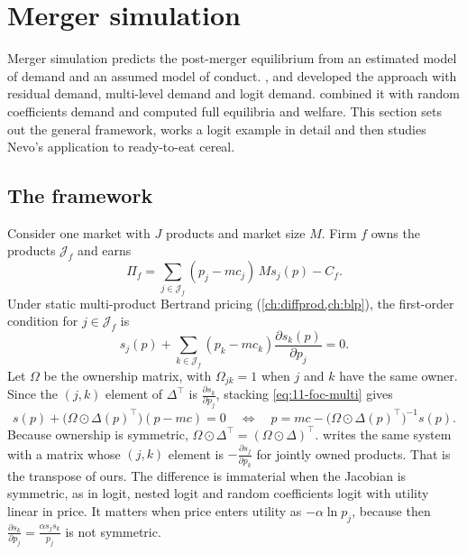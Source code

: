 \section{Merger simulation}\label{sec:11-simulation}

Merger simulation predicts the post-merger equilibrium from an estimated model of demand and an assumed model of
conduct. \citet{BakerBresnahan1985}, \citet{HausmanLeonardZona1994} and \citet{WerdenFroeb1994} developed the approach
with residual demand, multi-level demand and logit demand. \citet{Nevo2000b} combined it with random coefficients
demand and computed full equilibria and welfare. This section sets out the general framework, works a logit example
in detail and then studies Nevo's application to ready-to-eat cereal.

\subsection{The framework}\label{sec:11-simframework}

Consider one market with $J$ products and market size $M$. Firm $f$ owns the products $\mathcal{J}_f$ and earns
\begin{equation*}
  \Pi_f = \sum_{j \in \mathcal{J}_f} (p_j - mc_j)\, M s_j(p) - C_f .
\end{equation*}
Under static multi-product Bertrand pricing (\cref{ch:diffprod,ch:blp}), the first-order condition for $j \in
\mathcal{J}_f$ is
\begin{equation}\label{eq:11-foc-multi}
  s_j(p) + \sum_{k \in \mathcal{J}_f} (p_k - mc_k)\frac{\partial s_k(p)}{\partial p_j} = 0 .
\end{equation}
Let $\Omega$ be the ownership matrix, with $\Omega_{jk} = 1$ when $j$ and $k$ have the same owner. Since the $(j,k)$
element of $\Delta^\top$ is $\frac{\partial s_k}{\partial p_j}$, stacking \eqref{eq:11-foc-multi} gives
\begin{equation}\label{eq:11-foc-matrix}
  s(p) + \big(\Omega \odot \Delta(p)^\top\big)(p - mc) = 0
  \quad\Longleftrightarrow\quad
  p = mc - \big(\Omega \odot \Delta(p)^\top\big)^{-1} s(p) .
\end{equation}
Because ownership is symmetric, $\Omega \odot \Delta^\top = (\Omega \odot \Delta)^\top$. \citet{Nevo2000b} writes the
same system with a matrix whose $(j,k)$ element is $-\frac{\partial s_j}{\partial p_k}$ for jointly owned products. That
is the transpose of ours. The difference is immaterial when the Jacobian is symmetric, as in logit, nested logit and
random coefficients logit with utility linear in price. It matters when price enters utility as $-\alpha \ln p_j$,
because then $\frac{\partial s_k}{\partial p_j} = \frac{\alpha s_j s_k}{p_j}$ is not symmetric.


